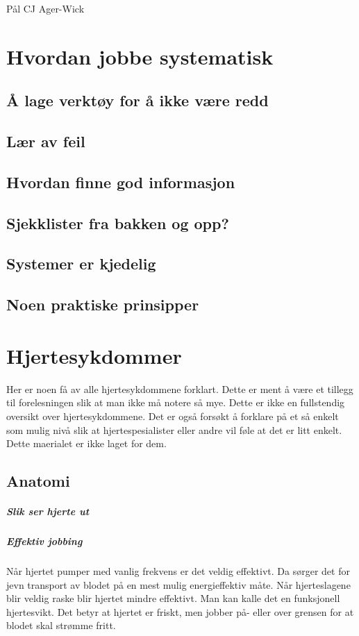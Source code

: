 \documentclass[12pt]{memoir} %
\begin{document}
				Pål CJ Ager-Wick

	\newpage
	\tableofcontents

\mainmatter
	\chapter{Hvordan jobbe systematisk}
		\section{Å lage verktøy for å ikke være redd}
		\section{Lær av feil}
		\section{Hvordan finne god informasjon}
		\section{Sjekklister fra bakken og opp?}
		\section{Systemer er kjedelig}
		\section{Noen praktiske prinsipper}
	\chapter{Hjertesykdommer}
		Her er noen få av alle hjertesykdommene forklart. Dette er ment å være et tillegg til forelesningen slik at man ikke må notere så mye. Dette er ikke en fullstendig oversikt over hjertesykdommene. Det er også forsøkt å forklare på et så enkelt som mulig nivå slik at hjertespesialister eller andre vil føle at det er litt enkelt. Dette maerialet er ikke laget for dem.\\
		\section{Anatomi}
			\paragraph{Slik ser hjerte ut\\}
			\paragraph{Effektiv jobbing\\}
				Når hjertet pumper med vanlig frekvens er det veldig effektivt. Da sørger det for jevn transport av blodet på en mest mulig energieffektiv måte. Når hjerteslagene blir veldig raske blir hjertet mindre effektivt\cite{!!!}. Man kan kalle det en funksjonell hjertesvikt. Det betyr at hjertet er friskt, men jobber på- eller over grensen for at blodet skal strømme fritt.
\end{document}
